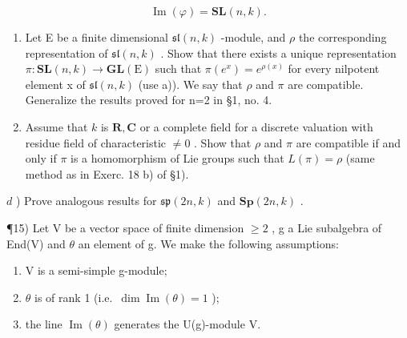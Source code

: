 \[
\operatorname{Im} (\varphi) = \mathbf {S L} (n, k).
\]

\begin{enumerate}
\def\labelenumi{\alph{enumi})}
\setcounter{enumi}{1}
\item
  Let E be a finite dimensional \(\mathfrak{sl}(n,k)\) -module, and \(\rho\) the corresponding representation of \(\mathfrak{sl}(n,k)\) . Show that there exists a unique representation \(\pi:\mathbf{SL}(n,k)\to\mathbf{GL}(\mathrm{E})\) such that \(\pi(e^{x})=e^{\rho(x)}\) for every nilpotent element x of \(\mathfrak{sl}(n,k)\) (use a)). We say that \(\rho\) and \(\pi\) are compatible. Generalize the results proved for n=2 in §1, no. 4.
\item
  Assume that \(k\) is \(\mathbf{R}, \mathbf{C}\) or a complete field for a discrete valuation with residue field of characteristic \(\neq 0\) . Show that \(\rho\) and \(\pi\) are compatible if and only if \(\pi\) is a homomorphism of Lie groups such that \(L(\pi) = \rho\) (same method as in Exerc. 18 b) of §1).
\end{enumerate}

\(d\) ) Prove analogous results for \(\mathfrak{sp}(2n,k)\) and \(\mathbf{Sp}(2n,k)\) .

¶15) Let V be a vector space of finite dimension \(\geq 2\) , g a Lie subalgebra of End(V) and \(\theta\) an element of g. We make the following assumptions:

\begin{enumerate}
\def\labelenumi{(\roman{enumi})}
\item
  V is a semi-simple g-module;
\item
  \(\theta\) is of rank 1 (i.e.~\(\dim \operatorname{Im}(\theta) = 1\) );
\item
  the line \(\operatorname{Im}(\theta)\) generates the U(g)-module V.
\end{enumerate}

